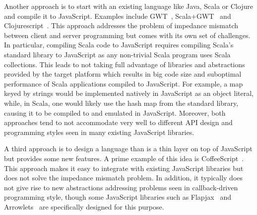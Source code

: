 \documentclass[runningheads,a4paper]{llncs}
\begin{document}
Another approach is to start with an existing language like Java, Scala or Clojure and compile it to JavaScript. Examples include GWT~\cite{gwt}, Scala+GWT~\cite{scala-gwt} and Clojurescript~\cite{clojurescript}. This approach addresses the problem of impedance mismatch between client and server programming but comes with its own set of challenges. In particular, compiling Scala code to JavaScript requires compiling Scala's standard library to JavaScript as any non-trivial Scala program uses Scala collections. This leads to not taking full advantage of libraries and abstractions provided by the target platform which results in big code size and suboptimal performance of Scala applications compiled to JavaScript. For example, a map keyed by strings would be implemented natively in JavaScript as an object literal, while, in Scala, one would likely use the hash map from the standard library, causing it to be compiled to and emulated in JavaScript. Moreover, both approaches tend to not accommodate very well to different API design and programming styles seen in many existing JavaScript libraries.

A third approach is to design a language than is a thin layer on top of JavaScript but provides some new features. A prime example of this idea is CoffeeScript~\cite{coffeescript}. This approach makes it easy to integrate with existing JavaScript libraries but does not solve the impedance mismatch problem. In addition, it typically does not give rise to new abstractions addressing problems seen in callback-driven programming style, though some JavaScript libraries such as Flapjax~\cite{flapjax} and Arrowlets~\cite{arrowlets} are specifically designed for this purpose.
\end{document}

